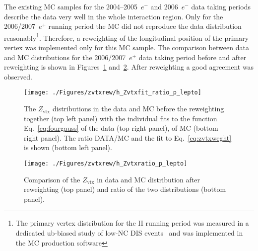 The existing MC samples for the 2004--2005~$e^-$ and 2006~$e^-$ data taking periods describe the data very well in the whole interaction region. Only for the 2006/2007~$e^+$ running period the MC did not reproduce the data distribution reasonably\footnote{The primary vertex distribution for the \hera II running period was measured in a dedicated ub-biased study of low-\qsq NC DIS events~\cite{upub:oliver:zn07008} and was implemented in the MC production software}. Therefore, a reweighting of the longitudinal position of the primary vertex was implemented only for this MC sample. The comparison between data and MC distributions for the 2006/2007~$e^+$ data taking period before and after reweighting is shown in Figures~\ref{fig:zvtxrew} and~\ref{fig:zvtxrewaf}. After reweighting a good agreement was observed.
\begin{figure}[t]
\begin{center}
 \hspace{-35pt}\texttt{[image: ./Figures/zvtxrew/h\_Zvtxfit\_ratio\_p\_lepto]}%
\end{center}
\caption{The $Z_\text{vtx}$ distributions in the data and \lepto MC before the reweighting together (top left panel) with the individual fits to the function Eq.~\eqref{eq:fourgauss} of the data (top right panel), of MC (bottom right panel). The ratio DATA/MC and the fit to Eq.~\eqref{eq:zvtxweght} is shown (bottom left panel).} 
\label{fig:zvtxrew}
\end{figure}

\begin{figure}[p]
\begin{center}
 \texttt{[image: ./Figures/zvtxrew/h\_Zvtxratio\_p\_lepto]}
\end{center}
\caption{Comparison of the $Z_\text{vtx}$ in data and \lepto MC distribution after reweighting (top panel) and ratio of the two distributions (bottom panel).} 
\label{fig:zvtxrewaf}
\end{figure}